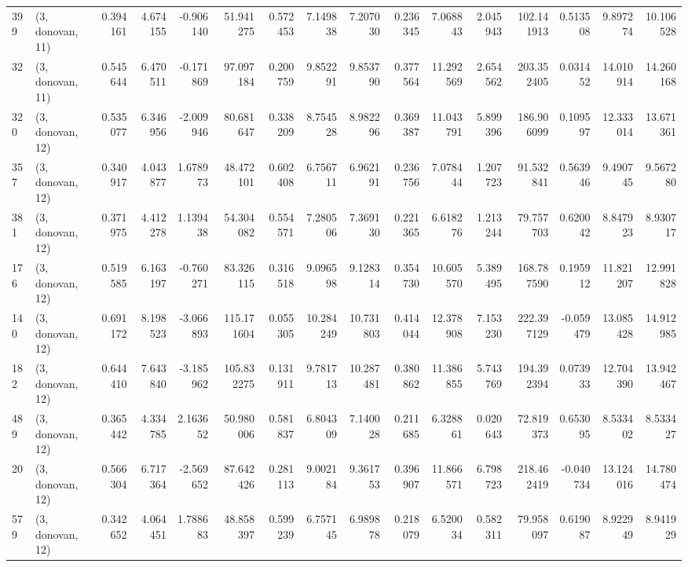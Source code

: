\begin{tabular}{llrrrrrrrrrrrrrr}
399 &  (3, donovan, 11) &   0.394161 &   4.674155 &  -0.906140 &    51.941275 &   0.572453 &   7.149838 &   7.207030 &  0.236345 &   7.068843 &   2.045943 &    102.141913 &   0.513508 &    9.897274 &   10.106528 \\
32  &  (3, donovan, 11) &   0.545644 &   6.470511 &  -0.171869 &    97.097184 &   0.200759 &   9.852291 &   9.853790 &  0.377564 &  11.292569 &   2.654562 &    203.352405 &   0.031452 &   14.010914 &   14.260168 \\
320 &  (3, donovan, 12) &   0.535077 &   6.346956 &  -2.009946 &    80.681647 &   0.338209 &   8.754528 &   8.982296 &  0.369387 &  11.043791 &   5.899396 &    186.906099 &   0.109597 &   12.333014 &   13.671361 \\
357 &  (3, donovan, 12) &   0.340917 &   4.043877 &   1.678973 &    48.472101 &   0.602408 &   6.756711 &   6.962191 &  0.236756 &   7.078444 &   1.207723 &     91.532841 &   0.563946 &    9.490745 &    9.567280 \\
381 &  (3, donovan, 12) &   0.371975 &   4.412278 &   1.139438 &    54.304082 &   0.554571 &   7.280506 &   7.369130 &  0.221365 &   6.618276 &   1.213244 &     79.757703 &   0.620042 &    8.847923 &    8.930717 \\
176 &  (3, donovan, 12) &   0.519585 &   6.163197 &  -0.760271 &    83.326115 &   0.316518 &   9.096598 &   9.128314 &  0.354730 &  10.605570 &   5.389495 &    168.787590 &   0.195912 &   11.821207 &   12.991828 \\
140 &  (3, donovan, 12) &   0.691172 &   8.198523 &  -3.066893 &   115.171604 &   0.055305 &  10.284249 &  10.731803 &  0.414044 &  12.378908 &   7.153230 &    222.397129 &  -0.059479 &   13.085428 &   14.912985 \\
182 &  (3, donovan, 12) &   0.644410 &   7.643840 &  -3.185962 &   105.832275 &   0.131911 &   9.781713 &  10.287481 &  0.380862 &  11.386855 &   5.743769 &    194.392394 &   0.073933 &   12.704390 &   13.942467 \\
489 &  (3, donovan, 12) &   0.365442 &   4.334785 &   2.163652 &    50.980006 &   0.581837 &   6.804309 &   7.140028 &  0.211685 &   6.328861 &   0.020643 &     72.819373 &   0.653095 &    8.533402 &    8.533427 \\
20  &  (3, donovan, 12) &   0.566304 &   6.717364 &  -2.569652 &    87.642426 &   0.281113 &   9.002184 &   9.361753 &  0.396907 &  11.866571 &   6.798723 &    218.462419 &  -0.040734 &   13.124016 &   14.780474 \\
579 &  (3, donovan, 12) &   0.342652 &   4.064451 &   1.788683 &    48.858397 &   0.599239 &   6.757145 &   6.989878 &  0.218079 &   6.520034 &   0.582311 &     79.958097 &   0.619087 &    8.922949 &    8.941929 \\

\end{tabular}
